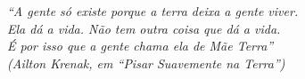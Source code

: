 \begin{epigrafe}
    \vspace*{\fill}
	\begin{flushright}
		\textit{``A gente só existe porque a terra deixa a gente viver. \\
		Ela dá a vida. Não tem outra coisa que dá a vida. \\
		É por isso que a gente chama ela de Mãe Terra” \\
		(Ailton Krenak, em “Pisar Suavemente na Terra”)}
	\end{flushright}
\end{epigrafe}
